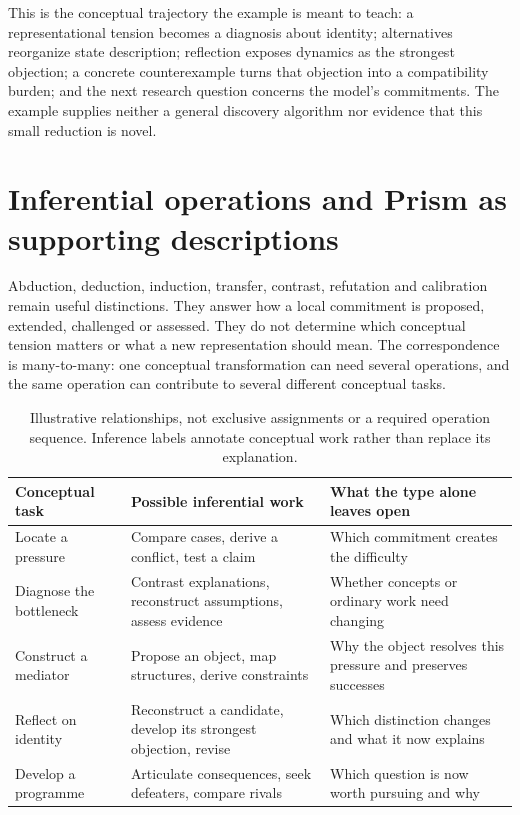 This is the conceptual trajectory the example is meant to teach: a representational
tension becomes a diagnosis about identity; alternatives reorganize state
description; reflection exposes dynamics as the strongest objection; a concrete
counterexample turns that objection into a compatibility burden; and the next
research question concerns the model's commitments. The example supplies neither
a general discovery algorithm nor evidence that this small reduction is novel.



\section{Inferential operations and Prism as supporting descriptions}
\label{sec:conceptual-support}
Abduction, deduction, induction, transfer, contrast, refutation and calibration
remain useful distinctions. They answer how a local commitment is proposed,
extended, challenged or assessed. They do not determine which conceptual tension
matters or what a new representation should mean. The correspondence is
many-to-many: one conceptual transformation can need several operations, and the
same operation can contribute to several different conceptual tasks.

\begin{table}[htbp]
\centering\small
\begin{tabularx}{\linewidth}{@{}>{\raggedright\arraybackslash}p{.30\linewidth}>{\raggedright\arraybackslash}X>{\raggedright\arraybackslash}X@{}}
\toprule
Conceptual task & Possible inferential work & What the type alone leaves open \\
\midrule
Locate a pressure & Compare cases, derive a conflict, test a claim & Which commitment creates the difficulty \\
Diagnose the bottleneck & Contrast explanations, reconstruct assumptions, assess evidence & Whether concepts or ordinary work need changing \\
Construct a mediator & Propose an object, map structures, derive constraints & Why the object resolves this pressure and preserves successes \\
Reflect on identity & Reconstruct a candidate, develop its strongest objection, revise & Which distinction changes and what it now explains \\
Develop a programme & Articulate consequences, seek defeaters, compare rivals & Which question is now worth pursuing and why \\
\bottomrule
\end{tabularx}
\caption{Illustrative relationships, not exclusive assignments or a required
operation sequence. Inference labels annotate conceptual work rather than replace
its explanation.}
\label{tab:conceptual-inference-map}
\end{table}

